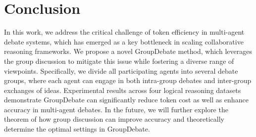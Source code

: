 \section{Conclusion}
\label{sec:conclusion}
In this work, we address the critical challenge of token efficiency in multi-agent debate systems, which has emerged as a key bottleneck in scaling collaborative reasoning frameworks.  We propose a novel GroupDebate method, which leverages the group discussion to mitigate this issue while fostering a diverse range of viewpoints. 
Specifically, we divide all participating agents into several debate groups, where each agent can engage in both intra-group debates and inter-group exchanges of ideas. 
Experimental results across four logical reasoning datasets demonstrate GroupDebate can significantly reduce token cost as well as enhance accuracy in multi-agent debates. 
In the future, we will further explore the theorem of how group discussion can improve accuracy and theoretically determine the optimal settings in GroupDebate. 